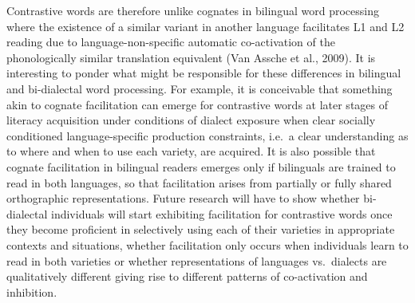 \documentclass[doc,floatsintext]{apa6}
\begin{document}
Contrastive words are therefore unlike cognates in bilingual word
processing where the existence of a similar variant in another language
facilitates L1 and L2 reading due to language-non-specific automatic
co-activation of the phonologically similar translation equivalent (Van
Assche et al., 2009). It is interesting to ponder what might be
responsible for these differences in bilingual and bi-dialectal word
processing. For example, it is conceivable that something akin to
cognate facilitation can emerge for contrastive words at later stages of
literacy acquisition under conditions of dialect exposure when clear
socially conditioned language-specific production constraints, i.e.~a
clear understanding as to where and when to use each variety, are
acquired. It is also possible that cognate facilitation in bilingual
readers emerges only if bilinguals are trained to read in both
languages, so that facilitation arises from partially or fully shared
orthographic representations. Future research will have to show whether
bi-dialectal individuals will start exhibiting facilitation for
contrastive words once they become proficient in selectively using each
of their varieties in appropriate contexts and situations, whether
facilitation only occurs when individuals learn to read in both
varieties or whether representations of languages vs.~dialects are
qualitatively different giving rise to different patterns of
co-activation and inhibition.
\end{document}
